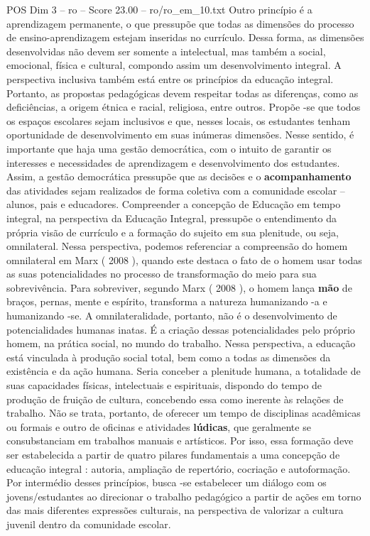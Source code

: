 \begin{textsample}{POS Dim 3 – ro – Score 23.00 – ro/ro\_em\_10.txt}
Outro princípio é a aprendizagem permanente, o que pressupõe que todas as dimensões do processo de ensino-aprendizagem estejam inseridas no currículo.
Dessa forma, as dimensões desenvolvidas não devem ser somente a intelectual, mas também a social, emocional, física e cultural, compondo assim um desenvolvimento integral.
A perspectiva inclusiva também está entre os princípios da educação integral.
Portanto, as propostas pedagógicas devem respeitar todas as diferenças, como as deficiências, a origem étnica e racial, religiosa, entre outros.
Propõe -se que todos os espaços escolares sejam inclusivos e que, nesses locais, os estudantes tenham oportunidade de desenvolvimento em suas inúmeras dimensões.
Nesse sentido, é importante que haja uma gestão democrática, com o intuito de garantir os interesses e necessidades de aprendizagem e desenvolvimento dos estudantes.
Assim, a gestão democrática pressupõe que as decisões e o \textbf{acompanhamento} das atividades sejam realizados de forma coletiva com a comunidade escolar – alunos, pais e educadores.
Compreender a concepção de Educação em tempo integral, na perspectiva da Educação Integral, pressupõe o entendimento da própria visão de currículo e a formação do sujeito em sua plenitude, ou seja, omnilateral.
Nessa perspectiva, podemos referenciar a compreensão do homem omnilateral em Marx ( 2008 ), quando este destaca o fato de o homem usar todas as suas potencialidades no processo de transformação do meio para sua sobrevivência.
Para sobreviver, segundo Marx ( 2008 ), o homem lança \textbf{mão} de braços, pernas, mente e espírito, transforma a natureza humanizando -a e humanizando -se.
A omnilateralidade, portanto, não é o desenvolvimento de potencialidades humanas inatas.
É a criação dessas potencialidades pelo próprio homem, na prática social, no mundo do trabalho.
Nessa perspectiva, a educação está vinculada à produção social total, bem como a todas as dimensões da existência e da ação humana.
Seria conceber a plenitude humana, a totalidade de suas capacidades físicas, intelectuais e espirituais, dispondo do tempo de produção de fruição de cultura, concebendo essa como inerente às relações de trabalho.
Não se trata, portanto, de oferecer um tempo de disciplinas acadêmicas ou formais e outro de oficinas e atividades \textbf{lúdicas}, que geralmente se consubstanciam em trabalhos manuais e artísticos.
Por isso, essa formação deve ser estabelecida a partir de quatro pilares fundamentais a uma concepção de educação integral : autoria, ampliação de repertório, cocriação e autoformação.
Por intermédio desses princípios, busca -se estabelecer um diálogo com os jovens/estudantes ao direcionar o trabalho pedagógico a partir de ações em torno das mais diferentes expressões culturais, na perspectiva de valorizar a cultura juvenil dentro da comunidade escolar.

\end{textsample}
